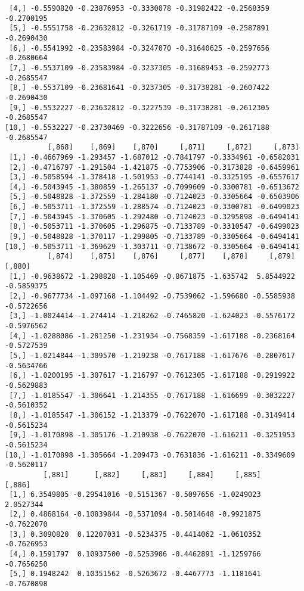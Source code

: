 \documentclass[
  letterpaper,
  DIV=11,
  numbers=noendperiod]{scrreprt}
\begin{document}
\begin{verbatim}
 [4,] -0.5590820 -0.23876953 -0.3330078 -0.31982422 -0.2568359 -0.2700195
 [5,] -0.5551758 -0.23632812 -0.3261719 -0.31787109 -0.2587891 -0.2690430
 [6,] -0.5541992 -0.23583984 -0.3247070 -0.31640625 -0.2597656 -0.2680664
 [7,] -0.5537109 -0.23583984 -0.3237305 -0.31689453 -0.2592773 -0.2685547
 [8,] -0.5537109 -0.23681641 -0.3237305 -0.31738281 -0.2607422 -0.2690430
 [9,] -0.5532227 -0.23632812 -0.3227539 -0.31738281 -0.2612305 -0.2685547
[10,] -0.5532227 -0.23730469 -0.3222656 -0.31787109 -0.2617188 -0.2685547
          [,868]    [,869]    [,870]     [,871]     [,872]     [,873]
 [1,] -0.4667969 -1.293457 -1.687012 -0.7841797 -0.3334961 -0.6582031
 [2,] -0.4716797 -1.291504 -1.421875 -0.7753906 -0.3173828 -0.6459961
 [3,] -0.5058594 -1.378418 -1.501953 -0.7744141 -0.3325195 -0.6557617
 [4,] -0.5043945 -1.380859 -1.265137 -0.7099609 -0.3300781 -0.6513672
 [5,] -0.5048828 -1.372559 -1.284180 -0.7124023 -0.3305664 -0.6503906
 [6,] -0.5053711 -1.372559 -1.288574 -0.7124023 -0.3300781 -0.6499023
 [7,] -0.5043945 -1.370605 -1.292480 -0.7124023 -0.3295898 -0.6494141
 [8,] -0.5053711 -1.370605 -1.296875 -0.7133789 -0.3310547 -0.6499023
 [9,] -0.5048828 -1.370117 -1.299805 -0.7133789 -0.3305664 -0.6494141
[10,] -0.5053711 -1.369629 -1.303711 -0.7138672 -0.3305664 -0.6494141
          [,874]    [,875]    [,876]     [,877]    [,878]     [,879]     [,880]
 [1,] -0.9638672 -1.298828 -1.105469 -0.8671875 -1.635742  5.8544922 -0.5859375
 [2,] -0.9677734 -1.097168 -1.104492 -0.7539062 -1.596680 -0.5585938 -0.5722656
 [3,] -1.0024414 -1.274414 -1.218262 -0.7465820 -1.624023 -0.5576172 -0.5976562
 [4,] -1.0288086 -1.281250 -1.231934 -0.7568359 -1.617188 -0.2368164 -0.5727539
 [5,] -1.0214844 -1.309570 -1.219238 -0.7617188 -1.617676 -0.2807617 -0.5634766
 [6,] -1.0200195 -1.307617 -1.216797 -0.7612305 -1.617188 -0.2919922 -0.5629883
 [7,] -1.0185547 -1.306641 -1.214355 -0.7617188 -1.616699 -0.3032227 -0.5610352
 [8,] -1.0185547 -1.306152 -1.213379 -0.7622070 -1.617188 -0.3149414 -0.5615234
 [9,] -1.0170898 -1.305176 -1.210938 -0.7622070 -1.616211 -0.3251953 -0.5615234
[10,] -1.0170898 -1.305664 -1.209473 -0.7631836 -1.616211 -0.3349609 -0.5620117
         [,881]      [,882]     [,883]     [,884]     [,885]     [,886]
 [1,] 6.3549805 -0.29541016 -0.5151367 -0.5097656 -1.0249023  2.0527344
 [2,] 0.4868164 -0.10839844 -0.5371094 -0.5014648 -0.9921875 -0.7622070
 [3,] 0.3090820  0.12207031 -0.5234375 -0.4414062 -1.0610352 -0.7626953
 [4,] 0.1591797  0.10937500 -0.5253906 -0.4462891 -1.1259766 -0.7656250
 [5,] 0.1948242  0.10351562 -0.5263672 -0.4467773 -1.1181641 -0.7670898

\end{verbatim}
\end{document}
